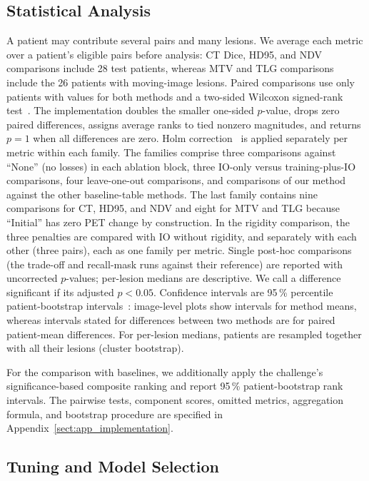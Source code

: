 \subsection{Statistical Analysis}
\label{sect:statistics}

A patient may contribute several pairs and many lesions.
We average each metric over a patient's eligible pairs before analysis: CT Dice, HD95, and NDV comparisons include 28 test patients, whereas MTV and TLG comparisons include the 26 patients with moving-image lesions.
Paired comparisons use only patients with values for both methods and a two-sided Wilcoxon signed-rank test~\cite{ref_wilcoxon}.
The implementation doubles the smaller one-sided $p$-value, drops zero paired differences, assigns average ranks to tied nonzero magnitudes, and returns $p=1$ when all differences are zero.
Holm correction~\cite{ref_holm} is applied separately per metric within each family.
The families comprise three comparisons against ``None'' (no losses) in each ablation block, three IO-only versus training-plus-IO comparisons, four leave-one-out comparisons, and comparisons of our method against the other baseline-table methods.
The last family contains nine comparisons for CT, HD95, and NDV and eight for MTV and TLG because ``Initial'' has zero PET change by construction.
In the rigidity comparison, the three penalties are compared with IO without rigidity, and separately with each other (three pairs), each as one family per metric.
Single post-hoc comparisons (the trade-off and recall-mask runs against their reference) are reported with uncorrected $p$-values; per-lesion medians are descriptive.
We call a difference significant if its adjusted $p<0.05$.
Confidence intervals are 95\,\% percentile patient-bootstrap intervals~\cite{ref_bootstrap}: image-level plots show intervals for method means, whereas intervals stated for differences between two methods are for paired patient-mean differences.
For per-lesion medians, patients are resampled together with all their lesions (cluster bootstrap).

For the comparison with baselines, we additionally apply the challenge's significance-based composite ranking and report 95\,\% patient-bootstrap rank intervals.
The pairwise tests, component scores, omitted metrics, aggregation formula, and bootstrap procedure are specified in Appendix~\ref{sect:app_implementation}.

\subsection{Tuning and Model Selection}
\label{sect:tuning}

